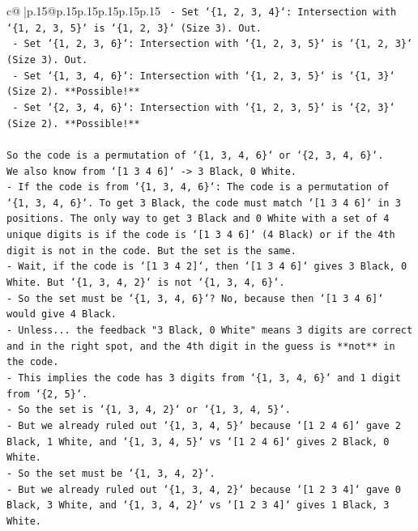 \documentclass{article}
\begin{document}
{\begin{supertabular}{c@{$\;$}|p{.15\linewidth}@{}p{.15\linewidth}p{.15\linewidth}p{.15\linewidth}p{.15\linewidth}p{.15\linewidth}}
{{{\texttt{        {-}   Set `\{1, 2, 3, 4\}`: Intersection with `\{1, 2, 3, 5\}` is `\{1, 2, 3\}` (Size 3). Out.} \\
\texttt{        {-}   Set `\{1, 2, 3, 6\}`: Intersection with `\{1, 2, 3, 5\}` is `\{1, 2, 3\}` (Size 3). Out.} \\
\texttt{        {-}   Set `\{1, 3, 4, 6\}`: Intersection with `\{1, 2, 3, 5\}` is `\{1, 3\}` (Size 2). **Possible!**} \\
\texttt{        {-}   Set `\{2, 3, 4, 6\}`: Intersection with `\{1, 2, 3, 5\}` is `\{2, 3\}` (Size 2). **Possible!**} \\
\\ 
\texttt{So the code is a permutation of `\{1, 3, 4, 6\}` or `\{2, 3, 4, 6\}`.} \\
\texttt{We also know from `{[}1 3 4 6{]}` {-}> 3 Black, 0 White.} \\
\texttt{{-}   If the code is from `\{1, 3, 4, 6\}`: The code is a permutation of `\{1, 3, 4, 6\}`. To get 3 Black, the code must match `{[}1 3 4 6{]}` in 3 positions. The only way to get 3 Black and 0 White with a set of 4 unique digits is if the code is `{[}1 3 4 6{]}` (4 Black) or if the 4th digit is not in the code. But the set is the same.} \\
\texttt{{-}   Wait, if the code is `{[}1 3 4 2{]}`, then `{[}1 3 4 6{]}` gives 3 Black, 0 White. But `\{1, 3, 4, 2\}` is not `\{1, 3, 4, 6\}`.} \\
\texttt{{-}   So the set must be `\{1, 3, 4, 6\}`? No, because then `{[}1 3 4 6{]}` would give 4 Black.} \\
\texttt{{-}   Unless... the feedback "3 Black, 0 White" means 3 digits are correct and in the right spot, and the 4th digit in the guess is **not** in the code.} \\
\texttt{{-}   This implies the code has 3 digits from `\{1, 3, 4, 6\}` and 1 digit from `\{2, 5\}`.} \\
\texttt{{-}   So the set is `\{1, 3, 4, 2\}` or `\{1, 3, 4, 5\}`.} \\
\texttt{{-}   But we already ruled out `\{1, 3, 4, 5\}` because `{[}1 2 4 6{]}` gave 2 Black, 1 White, and `\{1, 3, 4, 5\}` vs `{[}1 2 4 6{]}` gives 2 Black, 0 White.} \\
\texttt{{-}   So the set must be `\{1, 3, 4, 2\}`.} \\
\texttt{{-}   But we already ruled out `\{1, 3, 4, 2\}` because `{[}1 2 3 4{]}` gave 0 Black, 3 White, and `\{1, 3, 4, 2\}` vs `{[}1 2 3 4{]}` gives 1 Black, 3 White.} \\
}}}
\end{supertabular}}
\end{document}
